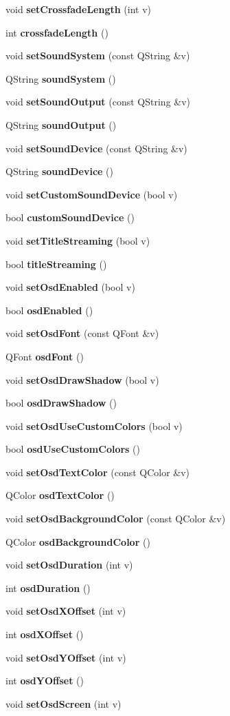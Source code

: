 \begin{CompactItemize}
void {\bf set\-Crossfade\-Length} (int v)
\item 
int {\bf crossfade\-Length} ()
\item 
void {\bf set\-Sound\-System} (const QString \&v)
\item 
QString {\bf sound\-System} ()
\item 
void {\bf set\-Sound\-Output} (const QString \&v)
\item 
QString {\bf sound\-Output} ()
\item 
void {\bf set\-Sound\-Device} (const QString \&v)
\item 
QString {\bf sound\-Device} ()
\item 
void {\bf set\-Custom\-Sound\-Device} (bool v)
\item 
bool {\bf custom\-Sound\-Device} ()
\item 
void {\bf set\-Title\-Streaming} (bool v)
\item 
bool {\bf title\-Streaming} ()
\item 
void {\bf set\-Osd\-Enabled} (bool v)
\item 
bool {\bf osd\-Enabled} ()
\item 
void {\bf set\-Osd\-Font} (const QFont \&v)
\item 
QFont {\bf osd\-Font} ()
\item 
void {\bf set\-Osd\-Draw\-Shadow} (bool v)
\item 
bool {\bf osd\-Draw\-Shadow} ()
\item 
void {\bf set\-Osd\-Use\-Custom\-Colors} (bool v)
\item 
bool {\bf osd\-Use\-Custom\-Colors} ()
\item 
void {\bf set\-Osd\-Text\-Color} (const QColor \&v)
\item 
QColor {\bf osd\-Text\-Color} ()
\item 
void {\bf set\-Osd\-Background\-Color} (const QColor \&v)
\item 
QColor {\bf osd\-Background\-Color} ()
\item 
void {\bf set\-Osd\-Duration} (int v)
\item 
int {\bf osd\-Duration} ()
\item 
void {\bf set\-Osd\-XOffset} (int v)
\item 
int {\bf osd\-XOffset} ()
\item 
void {\bf set\-Osd\-YOffset} (int v)
\item 
int {\bf osd\-YOffset} ()
\item 
void {\bf set\-Osd\-Screen} (int v)
\item 

\end{CompactItemize}

